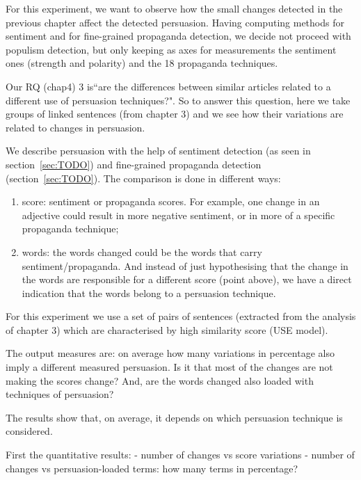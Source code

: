 For this experiment, we want to observe how the small changes detected in the previous chapter affect the detected persuasion.
Having computing methods for sentiment and for fine-grained propaganda detection, we decide not proceed with populism detection, but only keeping as axes for measurements the sentiment ones (strength and polarity) and the 18 propaganda techniques.

Our RQ (chap4) 3 is``are the differences between similar articles related to a different use of persuasion techniques?".
So to answer this question, here we take groups of linked sentences (from chapter 3) and we see how their variations are related to changes in persuasion.

We describe persuasion with the help of sentiment detection (as seen in section~\ref{sec:TODO}) and fine-grained propaganda detection (section~\ref{sec:TODO}).
The comparison is done in different ways:
\begin{enumerate}
    \item score: sentiment or propaganda scores. For example, one change in an adjective could result in more negative sentiment, or in more of a specific propaganda technique;
    \item words: the words changed could be the words that carry sentiment/propaganda. And instead of just hypothesising that the change in the words are responsible for a different score (point above), we have a direct indication that the words belong to a persuasion technique.
\end{enumerate}

For this experiment we use a set of pairs of sentences (extracted from the analysis of chapter 3) which are characterised by high similarity score (USE model). 


The output measures are: on average how many variations in percentage also imply a different measured persuasion. Is it that most of the changes are not making the scores change? And, are the words changed also loaded with techniques of persuasion? 

The results show that, on average, it depends on which persuasion technique is considered.

First the quantitative results: 
- number of changes vs score variations
- number of changes vs persuasion-loaded terms: how many terms in percentage?


